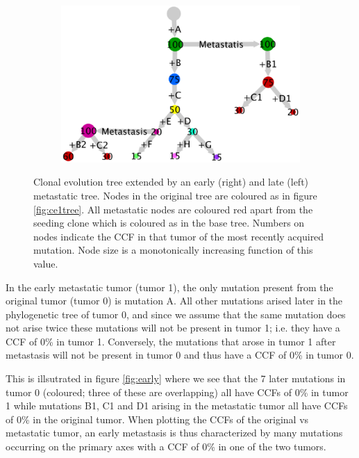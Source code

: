 \documentclass{article}
\begin{document}
\begin{figure}[h]
	\centering
	\begin{subfigure}[t]{0.60\linewidth}
		\centering
		\includegraphics[width = 1.0\linewidth, trim={0 0 0 0}, clip=true]{metastasis_tree.png}
	\end{subfigure}%
\caption{Clonal evolution tree extended by an early (right) and late (left) metastatic tree. Nodes in the original tree are coloured as in figure \ref{fig:ce1tree}. All metastatic nodes are coloured red apart from the seeding clone which is coloured as in the base tree. Numbers on nodes indicate the CCF in that tumor of the most recently acquired mutation. Node size is a monotonically increasing function of this value.}
\label{fig:metatree}
\end{figure}

In the early metastatic tumor (tumor 1), the only mutation present from the original tumor (tumor 0) is mutation A. All other mutations arised later in the phylogenetic tree of tumor 0, and since we assume that the same mutation does not arise twice these mutations will not be present in tumor 1; i.e. they have a CCF of 0\% in tumor 1. Conversely, the mutations that arose in tumor 1 after metastasis will not be present in tumor 0 and thus have a CCF of 0\% in tumor 0.

This is illsutrated in figure \ref{fig:early} where we see that the 7 later mutations in tumor 0 (coloured; three of these are overlapping) all have CCFs of 0\% in tumor 1 while mutations B1, C1 and D1 arising in the metastatic tumor all have CCFs of 0\% in the original tumor. When plotting the CCFs of the original vs metastatic tumor, an early metastasis is thus characterized by many mutations occurring on the primary axes with a CCF of 0\% in one of the two tumors.
\end{document}

